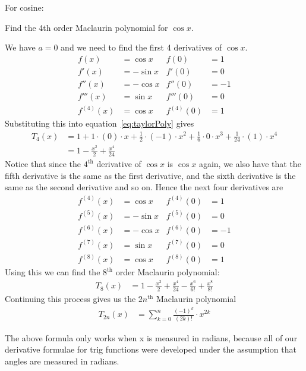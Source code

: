 For cosine:
\begin{eg}\label{eg expand cosx}
 Find the 4th order Maclaurin polynomial for $\cos x$.

\soln We have $a=0$ and we need to find the first 4 derivatives of $\cos x$.
\begin{align*}
 f(x) &= \cos x & f(0) &= 1 \\
 f'(x) &= -\sin x & f'(0) &= 0 \\
 f''(x) &= -\cos x & f''(0) &= -1 \\
 f'''(x) &= \sin x & f'''(0) &= 0 \\
 f^{(4)}(x) &= \cos x & f^{(4)}(0) &= 1
\end{align*}
Substituting this into equation~\eqref{eq:taylorPoly} gives
\begin{align*}
  T_4(x)&= 1 + 1\cdot (0) \cdot x
  + \frac{1}{2} \cdot (-1) \cdot x^2
  + \frac{1}{6} \cdot 0 \cdot x^3
  + \frac{1}{24} \cdot (1) \cdot x^4 \\
  &= 1 - \frac{x^2}{2} + \frac{x^4}{24}
\end{align*}
Notice that since the $4^\mathrm{th}$ derivative of $\cos x$ is $\cos x$ again, we also
have that the fifth derivative is the same as the first derivative, and the sixth
derivative is the same as the second derivative and so on. Hence the next four
derivatives are
\begin{align*}
 f^{(4)}(x) &= \cos x & f^{(4)}(0) &= 1 \\
 f^{(5)}(x) &= -\sin x & f^{(5)}(0) &= 0 \\
 f^{(6)}(x) &= -\cos x & f^{(6)}(0) &= -1 \\
 f^{(7)}(x) &= \sin x & f^{(7)}(0) &= 0 \\
 f^{(8)}(x) &= \cos x & f^{(8)}(0) &= 1
\end{align*}
Using this we can find the $8^\mathrm{th}$ order Maclaurin polynomial:
\begin{align*}
  T_8(x) &=
  1 - \frac{x^2}{2} + \frac{x^4}{24} -\frac{x^6}{6!} + \frac{x^8}{8!}
\end{align*}
Continuing this process gives us the $2n^\mathrm{th}$ Maclaurin polynomial
\begin{align*}
  T_{2n}(x) &= \sum_{k=0}^n \frac{(-1)^k}{(2k)!} \cdot x^{2k}
\end{align*}
\begin{warning}
The above formula only works when x is measured in radians, because all of our
derivative formulae for trig functions were developed under the assumption that
angles are measured in radians.
\end{warning}


\end{eg}
